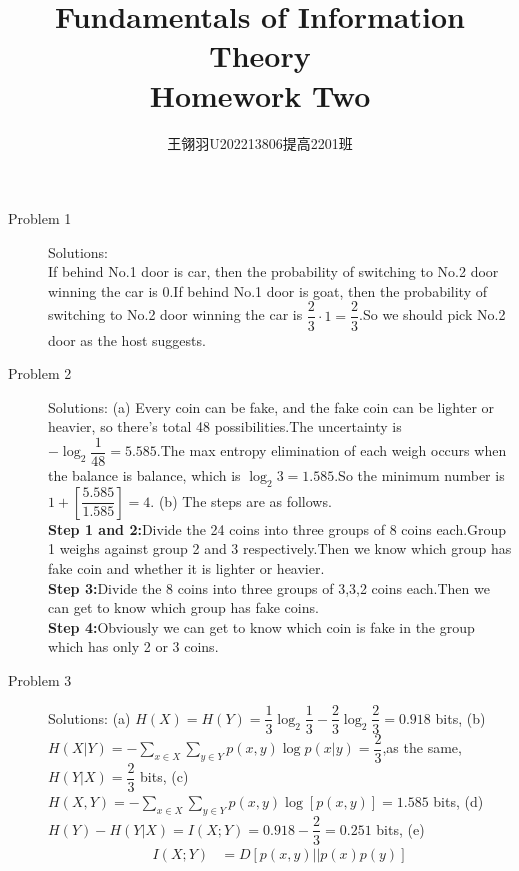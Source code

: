\documentclass[11pt]{article}
\begin{document}
\title{\vspace{-2cm}Fundamentals of Information Theory\\ Homework Two}
\author{王翎羽\quad U202213806\quad 提高2201班}
\maketitle

\begin{description}
    \item[Problem 1] Solutions:\\
    If behind No.1 door is car, then the probability of switching to No.2 door winning the car is $0$.If behind No.1 door is goat, then the probability of switching to No.2 door winning the car is $\dfrac{2}{3}\cdot 1=\dfrac{2}{3}$.So we should pick No.2 door as the host suggests.
    \item[Problem 2] Solutions:
        \subitem(a) Every coin can be fake, and the fake coin can be lighter or heavier, so there's total 48 possibilities.The uncertainty is $-\log_{2}{\dfrac{1}{48}}=5.585$.The max entropy elimination of each weigh occurs when the balance is balance, which is $\log_{2}3=1.585$.So the minimum number is $1+[\dfrac{5.585}{1.585}]=4$.
        \subitem(b) The steps are as follows.\\
                    \textbf{Step 1 and 2:}Divide the 24 coins into three groups of 8 coins each.Group 1 weighs against group 2 and 3 respectively.Then we know which group has fake coin and whether it is lighter or heavier.\\
                    \textbf{Step 3:}Divide the 8 coins into three groups of 3,3,2 coins each.Then we can get to know which group has fake coins.\\
                    \textbf{Step 4:}Obviously we can get to know which coin is fake in the group which has only 2 or 3 coins.
    \item[Problem 3] Solutions:
        \subitem(a) $H(X)=H(Y)=\dfrac{1}{3}\log_{2}\dfrac{1}{3}-\dfrac{2}{3}\log_{2}\dfrac{2}{3}=0.918$ bits,
        \subitem(b) $H(X|Y)=-\displaystyle\sum_{x\in X}\sum_{y\in Y}p(x,y)\log p(x|y)=\dfrac{2}{3}$,as the same,$H(Y|X)=\dfrac{2}{3}$ bits,
        \subitem(c) $H(X,Y)=-\displaystyle\sum_{x\in X}\sum_{y\in Y}p(x,y)\log[p(x,y)]=1.585$ bits,
        \subitem(d) $H(Y)-H(Y|X)=I(X;Y)=0.918-\dfrac{2}{3}=0.251$  bits,
        \subitem(e)\[\begin{aligned}
                            I(X;Y)&=D[p(x,y)||p(x)p(y)] \\

\end{aligned}\]
\end{description}
\end{document}
